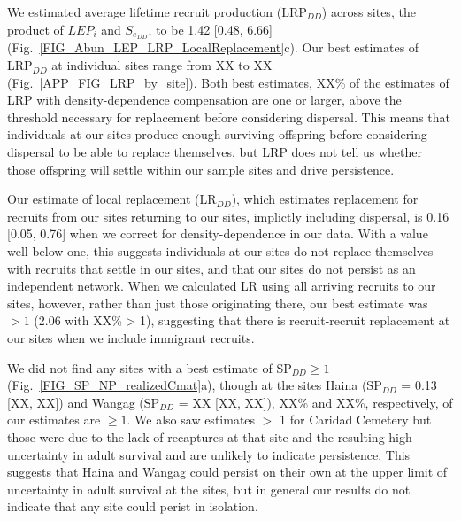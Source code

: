 \documentclass[12pt, oneside]{article}   	%
\begin{document}
We estimated average lifetime recruit production ($\text{LRP}_{DD}$) across sites, the product of $LEP_i$ and $S_{e_{DD}}$, to be 1.42 [0.48, 6.66] (Fig.\ \ref{FIG_Abun_LEP_LRP_LocalReplacement}c). Our best estimates of $\text{LRP}_{DD}$ at individual sites range from XX to XX (Fig.\ \ref{APP_FIG_LRP_by_site}). Both best estimates, XX\% of the estimates of LRP with density-dependence compensation are one or larger, above the threshold necessary for replacement before considering dispersal. This means that individuals at our sites produce enough surviving offspring before considering dispersal to be able to replace themselves, but LRP does not tell us whether those offspring will settle within our sample sites and drive persistence. %

Our estimate of local replacement ($\text{LR}_{DD}$), which estimates replacement for recruits from our sites returning to our sites, implictly including dispersal, is 0.16 [0.05, 0.76] when we correct for density-dependence in our data. With a value well below one, this suggests individuals at our sites do not replace themselves with recruits that settle in our sites, and that our sites do not persist as an independent network. When we calculated LR using all arriving recruits to our sites, however, rather than just those originating there, our best estimate was $> 1$ (2.06 with XX\% > 1), suggesting that there is recruit-recruit replacement at our sites when we include immigrant recruits.

We did not find any sites with a best estimate of $\text{SP}_{DD} \geq 1$ (Fig.\ \ref{FIG_SP_NP_realizedCmat}a), though at the sites Haina ($\text{SP}_{DD}$ = 0.13 [XX, XX]) and Wangag ($\text{SP}_{DD}$ = XX [XX, XX]), XX\% and XX\%, respectively, of our estimates are $\geq 1$. We also saw estimates $>$ 1 for Caridad Cemetery but those were due to the lack of recaptures at that site and the resulting high uncertainty in adult survival and are unlikely to indicate persistence. This suggests that Haina and Wangag could persist on their own at the upper limit of uncertainty in adult survival at the sites, but in general our results do not indicate that any site could perist in isolation. %
\end{document}
